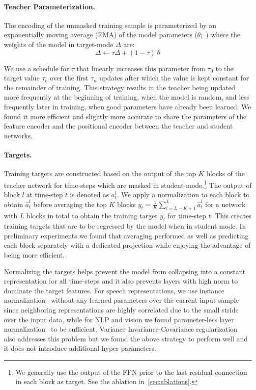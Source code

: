 \documentclass[nohyperref]{article}
\theoremstyle{plain}
\theoremstyle{definition}
\theoremstyle{remark}
\begin{document}
\paragraph{Teacher Parameterization.}
The encoding of the unmasked training sample is parameterized by an exponentially moving average (EMA) of the model parameters ($\theta$;~\citealt{tarvainen2018mean,grill2020byol,caron2021dino}) where the weights of the model in target-mode $\Delta$ are:
$$
\Delta \leftarrow \tau \Delta + (1 - \tau)~\theta
$$

We use a schedule for $\tau$ that linearly increases this parameter  from $\tau_0$ to the target value $\tau_e$ over the first $\tau_n$ updates after which the value is kept constant for the remainder of training.
This strategy results in the teacher being updated more frequently at the beginning of training, when the model is random, and less frequently later in training, when good parameters have already been learned. 
We found it more efficient and slightly more accurate to share the parameters of the feature encoder and the positional encoder between the teacher and student networks.

\paragraph{Targets.}
Training targets are constructed based on the output of the top $K$ blocks of the teacher network for time-steps which are masked in student-mode.\footnote{
We generally use the output of the FFN prior to the last residual connection in each block as target.
See the ablation in~\textsection\ref{sec:ablations}.
}
The output of block $l$ at time-step $t$ is denoted as $a_t^l$. 
We apply a normalization to each block to obtain $\hat{a}_t^l$ before averaging the top $K$ blocks $y_t = \frac{1}{K} \sum_{l=L-K+1}^L \hat{a}_t^l$ for a network with $L$ blocks in total to obtain the training target $y_t$ for time-step $t$.
This creates training targets that are to be regressed by the model when in student mode.
In preliminary experiments we found that averaging performed as well as predicting each block separately with a dedicated projection while enjoying the advantage of being more efficient.

Normalizing the targets helps prevent the model from collapsing into a constant representation for all time-steps and it also prevents layers with high norm to dominate the target features.
For speech representations, we use instance normalization~\citep{ulyanov2016in} without any learned parameters over the current input sample since neighboring representations are highly correlated due to the small stride over the input data, while for NLP and vision we found parameter-less layer normalization~\citep{ba2016layer} to be sufficient.
Variance-Invariance-Covariance regularization~\citep{bardes2021vicreg} also addresses this problem but we found the above strategy to perform well and it  does not introduce additional hyper-parameters.
\end{document}
